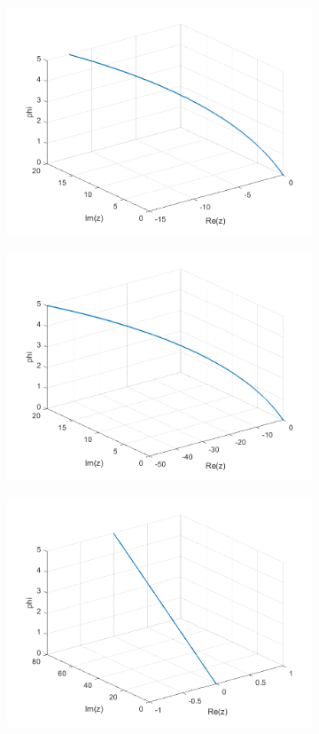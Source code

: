 \documentclass[a4paper,11pt]{article}
\begin{document}
\begin{figure}[!h]
\begin{subfigure}[c]{0.3\textwidth}
\includegraphics[width=\linewidth]{plot6_musg31.png}
\end{subfigure}
\begin{subfigure}[c]{0.3\textwidth}
\includegraphics[width=\linewidth]{plot6_musg32.png}
\end{subfigure}
\begin{subfigure}[c]{0.3\textwidth}
\includegraphics[width=\linewidth]{plot6_musg40.png}

\end{subfigure}
\end{figure}
\end{document}
